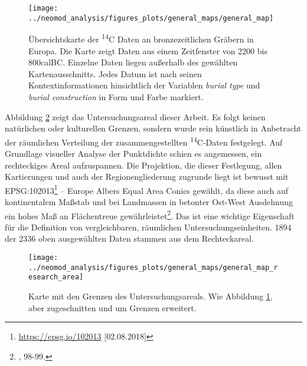 \documentclass[openany,twoside,twocolumn]{book}
\let\rmarkdownfootnote\footnote%
\def\footnote{\protect\rmarkdownfootnote}
\begin{document}
\begin{figure}
\texttt{[image: ../neomod\_analysis/figures\_plots/general\_maps/general\_map]} \caption[Übersichtskarte der \textsuperscript{14}C Daten an bronzezeitlichen Gräbern in Europa]{Übersichtskarte der \textsuperscript{14}C Daten an bronzezeitlichen Gräbern in Europa. Die Karte zeigt Daten aus einem  Zeitfenster von 2200 bis 800calBC. Einzelne Daten liegen außerhalb des gewählten Kartenausschnitts. Jedes Datum ist nach seinen Kontextinformationen hinsichtlich der Variablen \textit{burial type} und \textit{burial construction} in Form und Farbe markiert.}\label{fig:general-map}
\end{figure}

Abbildung \ref{fig:general-map-research-area} zeigt das Untersuchungsareal dieser Arbeit. Es folgt keinen natürlichen oder kulturellen Grenzen, sondern wurde rein künstlich in Anbetracht der räumlichen Verteilung der zusammengestellten \textsuperscript{14}C-Daten festgelegt. Auf Grundlage visueller Analyse der Punktdichte schien es angemessen, ein rechteckiges Areal aufzuspannen. Die Projektion, die dieser Festlegung, allen Kartierungen und auch der Regionengliederung zugrunde liegt ist bewusst mit EPSG:102013\footnote{\url{https://epsg.io/102013} {[}02.08.2018{]}} -- Europe Albers Equal Area Conics gewählt, da diese auch auf kontinentalem Maßstab und bei Landmassen in betonter Ost-West Ausdehnung ein hohes Maß an Flächentreue gewährleistet\footnote{\textcite{snyder_map_1987}, 98-99.}. Das ist eine wichtige Eigenschaft für die Definition von vergleichbaren, räumlichen Untersuchungseinheiten. 1894 der 2336 oben ausgewählten Daten stammen aus dem Rechteckareal.

\begin{figure}
\texttt{[image: ../neomod\_analysis/figures\_plots/general\_maps/general\_map\_research\_area]} \caption[Karte mit den Grenzen des Untersuchungsareals]{Karte mit den Grenzen des Untersuchungsareals. Wie Abbildung \ref{fig:general-map}, aber zugeschnitten und um Grenzen erweitert.}\label{fig:general-map-research-area}
\end{figure}
\end{document}
